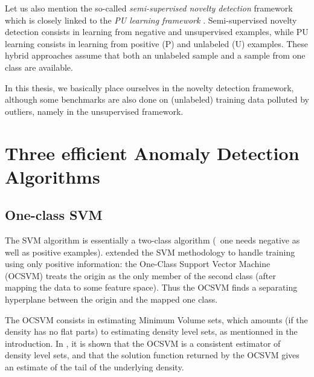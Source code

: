 Let us also mention the so-called \emph{semi-supervised novelty detection} \citep{Blanchard2010, Smola2009} framework which is closely linked to the \emph{PU learning framework} \citep{Denis2005, Liu2002, Mordelet2014, duPlessis2015}. 
Semi-supervised novelty detection consists in learning from negative and unsupervised examples, while PU learning consists in learning from positive (P) and unlabeled (U) examples. These hybrid approaches assume that both an unlabeled sample and a sample from one class are available.

In this thesis, we basically place ourselves in the novelty detection framework, although some benchmarks are also done on (unlabeled) training data polluted by outliers, namely in the unsupervised framework.

\section{Three efficient Anomaly Detection Algorithms}
\label{sec:AD_sklearn}


\subsection{One-class SVM}

The SVM algorithm is essentially a two-class algorithm (\ie~one needs negative as well as positive examples).
\cite{Scholkopf2001} extended the SVM methodology to handle training using only positive information:
the One-Class Support Vector Machine (OCSVM) treats the origin as the only member of the second class (after mapping the data to some feature space). Thus the OCSVM finds a separating hyperplane between the origin and the mapped one class. %

The OCSVM consists in estimating Minimum Volume sets, which amounts (if the density has no flat parts) to estimating density level sets, as mentionned in the introduction.
In \cite{VertVert}, it is shown that the OCSVM is a consistent estimator of density level sets, and that the solution function returned by the OCSVM gives an estimate of the tail of the underlying density.

